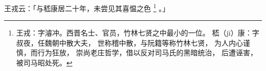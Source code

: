 
\switchcolumn*[\section{}]

王戎云：「与嵇康居二十年，未尝见其喜愠之色%
\footnote{%
    王戎：字濬冲。西晋名士、官员，竹林七贤之中最小的一位。
    嵇（jī）康：字叔夜，任魏朝中散大夫，
                世称稽中散，与阮籍等称竹林七贤，
                为人内心谨慎，而行为狂放，
                崇尚老庄哲学，借以反对司马氏的黑暗统治，
                后遭诬害，被司马昭处死。
}%
。」

\switchcolumn


